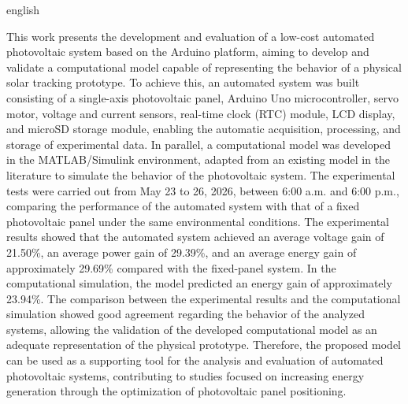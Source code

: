 \documentclass[
	12pt,				%
	twoside,			%
	a4paper,			%
	chapter=TITLE,		%
	section=TITLE,		%
	subsection=TITLE,	%
	subsubsection=TITLE,%
	english,			%
	french,				%
	spanish,			%
	brazilian,			%
	]{abntex2}
\begin{document}
\begin{resumo}[Abstract]
\begin{otherlanguage*}{english}

	This work presents the development and evaluation of a low-cost automated photovoltaic system based on the Arduino platform, aiming to develop and validate a computational model capable of representing the behavior of a physical solar tracking prototype. To achieve this, an automated system was built consisting of a single-axis photovoltaic panel, Arduino Uno microcontroller, servo motor, voltage and current sensors, real-time clock (RTC) module, LCD display, and microSD storage module, enabling the automatic acquisition, processing, and storage of experimental data. In parallel, a computational model was developed in the MATLAB/Simulink environment, adapted from an existing model in the literature to simulate the behavior of the photovoltaic system. The experimental tests were carried out from May 23 to 26, 2026, between 6:00 a.m. and 6:00 p.m., comparing the performance of the automated system with that of a fixed photovoltaic panel under the same environmental conditions. The experimental results showed that the automated system achieved an average voltage gain of 21.50\%, an average power gain of 29.39\%, and an average energy gain of approximately 29.69\% compared with the fixed-panel system. In the computational simulation, the model predicted an energy gain of approximately 23.94\%. The comparison between the experimental results and the computational simulation showed good agreement regarding the behavior of the analyzed systems, allowing the validation of the developed computational model as an adequate representation of the physical prototype. Therefore, the proposed model can be used as a supporting tool for the analysis and evaluation of automated photovoltaic systems, contributing to studies focused on increasing energy generation through the optimization of photovoltaic panel positioning. 

\end{otherlanguage*}
\end{resumo}

\listoffigures*
\cleardoublepage

\listoftables*
\cleardoublepage
\end{document}
